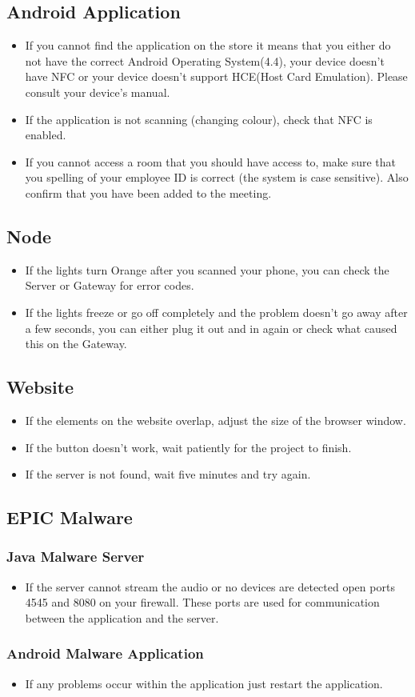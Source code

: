 \documentclass{article}
\begin{document}
\subsection{Android Application}
\begin{itemize}
\item If you cannot find the application on the store it means that you either do not have the correct Android Operating System(4.4), your device doesn't have NFC or your device doesn't support HCE(Host Card Emulation). Please consult your device's manual.
\item If the application is not scanning (changing colour), check that NFC is enabled.
\item If you cannot access a room that you should have access to, make sure that you spelling of your employee ID is correct (the system is case sensitive). Also confirm that you have been added to the meeting.
\end{itemize}

\subsection{Node}
\begin{itemize}
\item If the lights turn Orange after you scanned your phone, you can check the Server or Gateway for error codes.
\item If the lights freeze or go off completely and the problem doesn't go away after a few seconds, you can either plug it out and in again or check what caused this on the Gateway.
\end{itemize}


\subsection{Website}
\begin{itemize}
\item If the elements on the website overlap, adjust the size of the browser window.
\item If the button doesn't work, wait patiently for the project to finish.
\item If the server is not found, wait five minutes and try again.
\end{itemize}


\subsection{EPIC Malware}
\subsubsection{Java Malware Server}
\begin{itemize}
\item If the server cannot stream the audio or no devices are detected open ports 4545 and 8080 on your firewall. These ports are used for communication between the application and the server.
\end{itemize}
\subsubsection{Android Malware Application}
\begin{itemize}
\item If any problems occur within the application just restart the application.
\end{itemize}
\end{document}
